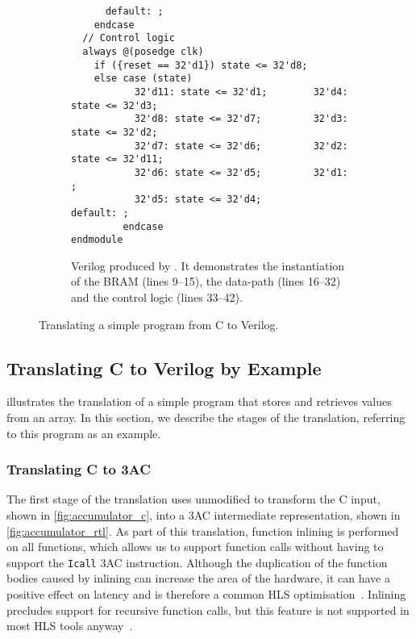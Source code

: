 \begin{figure}
\begin{subfigure}[b]{0.65\linewidth}
\begin{verbatim}
      default: ;
    endcase
  // Control logic
  always @(posedge clk)
    if ({reset == 32'd1}) state <= 32'd8;
    else case (state)
           32'd11: state <= 32'd1;        32'd4: state <= 32'd3;
           32'd8: state <= 32'd7;         32'd3: state <= 32'd2;
           32'd7: state <= 32'd6;         32'd2: state <= 32'd11;
           32'd6: state <= 32'd5;         32'd1: ;
           32'd5: state <= 32'd4;         default: ;
         endcase
endmodule
\end{verbatim}
\caption{Verilog produced by \vericert{}. It demonstrates the instantiation of the \gls{BRAM} (lines 9--15), the data-path (lines 16--32) and the control logic (lines 33--42).}\label{fig:accumulator_v}
\end{subfigure}
\caption{Translating a simple program from C to Verilog.}\label{fig:accumulator_c_rtl}
\end{figure}

\subsection{Translating C to Verilog by Example}
 illustrates the translation of a simple program
that stores and retrieves values from an array.  In this section, we describe
the stages of the \vericert{} translation, referring to this program as an
example.

\subsubsection{Translating C to 3AC}

The first stage of the translation uses unmodified \compcert{} to transform the
C input, shown in \cref{fig:accumulator_c}, into a 3AC intermediate
representation, shown in \cref{fig:accumulator_rtl}.  As part of this
translation, function inlining is performed on all functions, which allows us to
support function calls without having to support the \texttt{Icall} 3AC
instruction.  Although the duplication of the function bodies caused by inlining
can increase the area of the hardware, it can have a positive effect on latency
and is therefore a common HLS optimisation~\cite{noronha17_rapid_fpga}. Inlining
precludes support for recursive function calls, but this feature is not
supported in most HLS tools anyway~\cite{davidthomas_asap16}.

